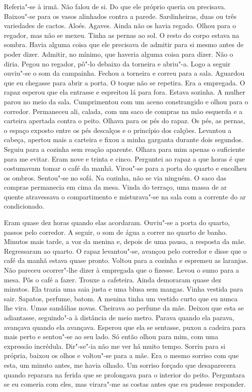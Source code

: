 Referia"-se à irmã. Não falou de si. Do que ele próprio queria ou
precisava. Baixou"-se para os vasos alinhados contra a parede.
Sardinheiras, duas ou três variedades de cactos. Aloés. Agaves. Ainda
não os havia regado. Olhou para o regador, mas não se mexeu. Tinha as
pernas ao sol. O resto do corpo estava na sombra. Havia alguma coisa que
ele precisava de admitir para si mesmo antes de poder dizer. Admitir,
no mínimo, que haveria alguma coisa para dizer. Não o diria. Pegou no
regador, pô"-lo debaixo da torneira e abriu"-a. Logo a seguir ouviu"-se
o som da campainha. Fechou a torneira e correu para a sala. Aguardou que
eu chegasse para abrir a porta. O toque não se repetira. Era a
empregada. O rapaz esperou que ela entrasse e espreitou lá para fora.
Estava sozinha. A mulher parou no meio da sala. Cumprimentou com um
aceno constrangido e olhou para o corredor. Permaneceu ali, calada, com
um saco de compras na mão esquerda e a carteira apertada contra o peito.
Olhava para os pés do rapaz. Os pés, as pernas, o espaço exposto entre
os pés descalços e o princípio dos calções. Levantou a cabeça, apertou
mais a carteira e fixou a minha garganta durante dois segundos. Seguiu
para a cozinha sem reação aparente. Olhara para mim apenas o suficiente
para me evitar. Eram nove e trinta e cinco. Perguntei ao rapaz a que
horas é que costumavam tomar o café da manhã. Virou"-se para a porta
do quarto e encolheu os ombros. Sentou"-se no sofá. Na cozinha, não se
via ninguém. O saco das compras permanecia em cima da mesa. Vinda do
terraço, uma massa de ar quente atravessava o compartimento e
misturava"-se na sala com a corrente do ar condicionado.

Eram quase dez horas quando elas acordaram. Ouviu"-se a porta do quarto,
passos pelo corredor. A seguir, o som de água a correr no quarto de
banho. Minutos mais tarde, a voz da menina e, depois de uma pausa, a
resposta da mãe. Regressaram ao quarto. O rapaz levantou"-se, avançou
pelo corredor e disse que o café da manhã estava quase pronto. Voltou
para a cozinha e espremeu as laranjas. Não pareceu ocorrer"-lhe dizer à
empregada que o fizesse. Levou o sumo para a mesa. Pôs o café a fazer.
Trouxe a cafeteira. Ainda demoraram quase dez minutos. Ela trazia uma
saia justa e uma blusa sem mangas. Vinha vestida para sair. Sapatos,
perfume, batom. A menina tinha um vestido curto que eu nunca lhe vira.
Umas sandálias novas. Cheirava ao perfume da mãe. Deixou que esta se
adiantasse, seguindo"-a à distância de meio metro. Parava quando ela
parava, avançava quando ela avançava. Esperou que ela se sentasse, puxou
a cadeira para mais perto e sentou"-se ao seu lado. Só então olhou para
mim, com uma expressão incrédula. Dir"-se"-ia não me ver há muito tempo.
Sorriu para si própria, baixou os olhos e voltou"-se para a mãe. Era o
mesmo sorriso com que esta, um minuto antes, me havia olhado. Um sorriso
forçado que desaparecera quando reparara na ferida que se prolongava
para o interior do peito. Perguntara se eu comeria com eles, mas
virara"-me as costas antes que eu pudesse responder.

